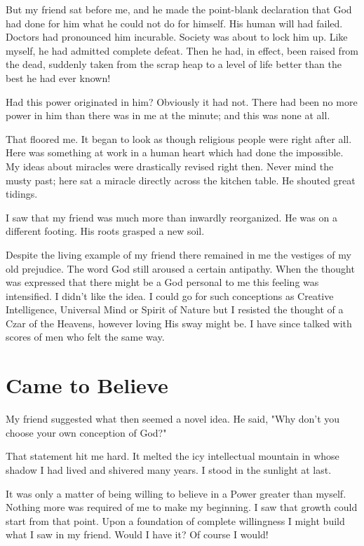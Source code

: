 But my friend sat before me, and he made the point-blank declaration that God had done for him what he could not do for himself.
His human will had failed.
Doctors had pronounced him incurable.
Society was about to lock him up.
Like myself, he had admitted complete defeat.
Then he had, in effect, been raised from the dead, suddenly taken from the scrap heap to a level of life better than the best he had ever known!

Had this power originated in him?
Obviously it had not.
There had been no more power in him than there was in me at the minute; and this was none at all.

That floored me.
It began to look as though religious people were right after all.
Here was something at work in a human heart which had done the impossible.
My ideas about miracles were drastically revised right then.
Never mind the musty past; here sat a miracle directly across the kitchen table.
He shouted great tidings.

I saw that my friend was much more than inwardly reorganized.
He was on a different footing.
His roots grasped a new soil.

Despite the living example of my friend there remained in me the vestiges of my old prejudice.
The word God still aroused a certain antipathy.
When the thought was expressed that there might be a God personal to me this feeling was intensified.
I didn't like the idea.
I could go for such conceptions as Creative Intelligence, Universal Mind or Spirit of Nature but I resisted the thought of a Czar of the Heavens, however loving His sway might be.
I have since talked with scores of men who felt the same way.


\section{Came to Believe}

My friend suggested what then seemed a novel idea.  He said, "Why don't you choose your own conception of God?"

That statement hit me hard.
It melted the icy intellectual mountain in whose shadow I had lived and shivered many years.
I stood in the sunlight at last.

It was only a matter of being willing to believe in a Power greater than myself.
Nothing more was required of me to make my beginning.
I saw that growth could start from that point.
Upon a foundation of complete willingness I might build what I saw in my friend.
Would I have it?
Of course I would!

